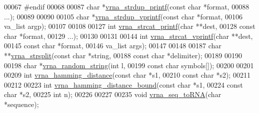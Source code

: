 \begin{DoxyCode}
00067 \textcolor{preprocessor}{#endif}
00068 
00087 \textcolor{keywordtype}{char} *\hyperlink{group__string__utils_ga33cc0190a326ec368277caa777b8bf18}{vrna\_strdup\_printf}(\textcolor{keyword}{const} \textcolor{keywordtype}{char} *format,
00088                          ...);
00089 
00090 
00105 \textcolor{keywordtype}{char} *\hyperlink{group__string__utils_ga459fdee190ed81bb7773cbaf671748a9}{vrna\_strdup\_vprintf}(\textcolor{keyword}{const} \textcolor{keywordtype}{char}  *format,
00106                           va\_list     argp);
00107 
00108 
00127 \textcolor{keywordtype}{int} \hyperlink{group__string__utils_gac0771ec71316023067f2aae61a5aa0fb}{vrna\_strcat\_printf}(\textcolor{keywordtype}{char}       **dest,
00128                        \textcolor{keyword}{const} \textcolor{keywordtype}{char} *format,
00129                        ...);
00130 
00131 
00144 \textcolor{keywordtype}{int} \hyperlink{group__string__utils_ga122df216996ba62fd5056b7743e3131a}{vrna\_strcat\_vprintf}(\textcolor{keywordtype}{char}        **dest,
00145                         \textcolor{keyword}{const} \textcolor{keywordtype}{char}  *format,
00146                         va\_list     args);
00147 
00148 
00187 \textcolor{keywordtype}{char} **\hyperlink{group__string__utils_gac632775617f4b2df096bfe8efb53d07f}{vrna\_strsplit}(\textcolor{keyword}{const} \textcolor{keywordtype}{char} *\textcolor{keywordtype}{string},
00188                      \textcolor{keyword}{const} \textcolor{keywordtype}{char} *delimiter);
00189 
00190 
00198 \textcolor{keywordtype}{char} *\hyperlink{group__string__utils_ga4eeb3750dcf860b9f3158249f95dbd7f}{vrna\_random\_string}(\textcolor{keywordtype}{int}        l,
00199                          \textcolor{keyword}{const} \textcolor{keywordtype}{char} symbols[]);
00200 
00201 
00209 \textcolor{keywordtype}{int} \hyperlink{group__string__utils_ga301798b43b6f66687985c725efd14f32}{vrna\_hamming\_distance}(\textcolor{keyword}{const} \textcolor{keywordtype}{char}  *s1,
00210                           \textcolor{keyword}{const} \textcolor{keywordtype}{char}  *s2);
00211 
00212 
00223 \textcolor{keywordtype}{int} \hyperlink{group__string__utils_ga5d1c2271e79d9bcb52d4e68360763fb9}{vrna\_hamming\_distance\_bound}(\textcolor{keyword}{const} \textcolor{keywordtype}{char}  *s1,
00224                                 \textcolor{keyword}{const} \textcolor{keywordtype}{char}  *s2,
00225                                 \textcolor{keywordtype}{int}         n);
00226 
00227 
00235 \textcolor{keywordtype}{void} \hyperlink{group__string__utils_gacfed92cba77064f6c743f9118d079bfc}{vrna\_seq\_toRNA}(\textcolor{keywordtype}{char} *sequence);

\end{DoxyCode}
